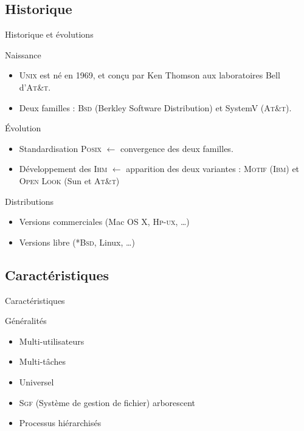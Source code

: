 \subsection{Historique}
\begin{frame}{Historique et évolutions}
\begin{block}{Naissance}
\begin{itemize}
\item \textsc{Unix} est né en 1969, et conçu par Ken Thomson aux laboratoires Bell d'\textsc{At\&t}.
\item Deux familles : \textsc{Bsd} (Berkley Software Distribution) et SystemV (\textsc{At\&t}).
\end{itemize}

\end{block}

\begin{block}{Évolution}
\begin{itemize}
\item Standardisation \textsc{Posix} $\leftarrow$ convergence des deux familles.
\item Développement des \textsc{Ihm} $\leftarrow$ apparition des deux variantes : \textsc{Motif} (\textsc{Ibm}) et \textsc{Open Look} (Sun et \textsc{At\&t})
\end{itemize}

\end{block}

\begin{block}{Distributions}
\begin{itemize}
\item Versions commerciales (Mac OS X, \textsc{Hp-ux}, \ldots)
\item Versions libre (\textsc{*Bsd}, Linux, \ldots)
\end{itemize}
\end{block}

\end{frame}

\subsection{Caractéristiques}
\begin{frame}{Caractéristiques}
\begin{block}{Généralités}
\begin{itemize}
\item Multi-utilisateurs
\item Multi-tâches
\item Universel
\item \textsc{Sgf} (Système de gestion de fichier) arborescent
\item Processus hiérarchisés
\end{itemize}
\end{block}
\end{frame}


